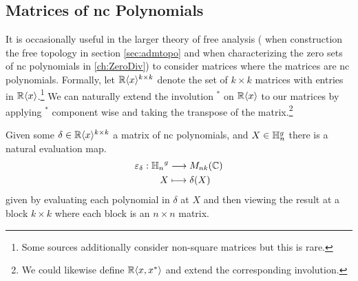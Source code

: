 \subsection{Matrices of nc Polynomials}

It is occasionally useful in the larger theory of free analysis (\eg{} when
construction the free topology in section \ref{sec:admtopo} and when
characterizing the zero sets of nc polynomials in \ref{ch:ZeroDiv}) to consider
matrices where the matrices are nc polynomials. Formally,
let \(\mathbb{R} \langle x \rangle ^{k\times k}\) denote the set of \(k \times k\) matrices
with entries in \(\mathbb{R} \langle x \rangle \).\footnote{Some sources additionally
  consider non-square matrices but this is rare.}
We can naturally extend the involution \(^*\) on \(\mathbb{R} \langle x \rangle \) to
our matrices by applying \(^*\) component wise and taking the transpose of the
matrix.\footnote{We could likewise define
  \(\mathbb{R} \langle x,x^* \rangle\) and extend the corresponding involution.}

Given some \(\delta \in \mathbb{R} \langle x \rangle ^{k \times k}\) a matrix of nc
polynomials, and \(X \in \mathbb{H}_n^g\) there is a natural evaluation map.
\begin{align*}
  \varepsilon_\delta: {\mathbb{H}_n}^g &\longrightarrow M_{nk}(\mathbb{C}) \\
             X &\longmapsto \delta(X)
\end{align*}
given by evaluating each polynomial in \(\delta\) at \(X\) and then viewing the
result at a block \(k \times k\) where each block is an \(n \times n\) matrix.

